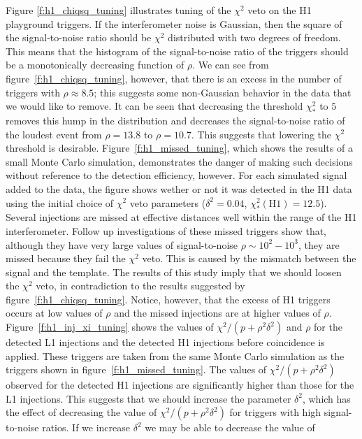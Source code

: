 Figure \ref{f:h1_chiqsq_tuning} illustrates tuning of the $\chi^2$ veto on the
H1 playground triggers. If the interferometer noise is Gaussian, then the
square of the signal-to-noise ratio should be $\chi^2$ distributed with two
degrees of freedom. This means that the histogram of the signal-to-noise ratio
of the triggers should be a monotonically decreasing function of $\rho$. We
can see from figure~\ref{f:h1_chiqsq_tuning}, however, that there is an excess
in the number of triggers with $\rho \approx 8.5$; this suggests some
non-Gaussian behavior in the data that we would like to remove. It can be seen
that decreasing the threshold $\chi^2_\ast$ to $5$ removes this hump in the
distribution and decreases the signal-to-noise ratio of the loudest event from
$\rho = 13.8$ to $\rho = 10.7$. This suggests that lowering the $\chi^2$
threshold is desirable.  Figure~\ref{f:h1_missed_tuning}, which shows the
results of a small Monte Carlo simulation, demonstrates the danger of making
such decisions without reference to the detection efficiency, however. For
each simulated signal added to the data, the figure shows wether or not it was
detected in the H1 data using the initial choice of $\chi^2$ veto parameters
($\delta^2 = 0.04$, $\chi^2_\ast(\mathrm{H1}) = 12.5$). Several injections are
missed at effective distances well within the range of the H1 interferometer.
Follow up investigations of these missed triggers show that, although they
have very large values of signal-to-noise $\rho \sim 10^2 - 10^3$, they are
missed because they fail the $\chi^2$ veto. This is caused by the mismatch
between the signal and the template.  The results of this study imply that we
should loosen the $\chi^2$ veto, in contradiction to the results suggested by
figure~\ref{f:h1_chiqsq_tuning}.  Notice, however, that the excess of H1
triggers occurs at low values of $\rho$ and the missed injections are at
higher values of $\rho$. Figure~\ref{f:h1_inj_xi_tuning} shows the values of
$\chi^2/(p+\rho^2\delta^2)$ and $\rho$ for the detected L1 injections and the
detected H1 injections before coincidence is applied. These triggers are taken
from the same Monte Carlo simulation as the triggers shown in
figure~\ref{f:h1_missed_tuning}. The values of $\chi^2/(p+\rho^2\delta^2)$
observed for the detected H1 injections are significantly higher than those
for the L1 injections. This suggests that we should increase the parameter
$\delta^2$, which has the effect of decreasing the value of
$\chi^2/(p+\rho^2\delta^2)$ for triggers with high signal-to-noise ratios. If
we increase $\delta^2$ we may be able to decrease the value of
